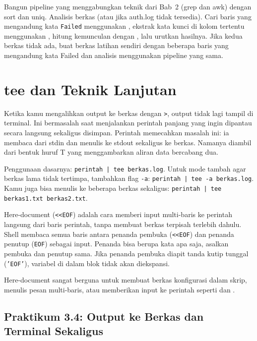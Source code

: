 \begin{challengebox}
Bangun pipeline yang menggabungkan teknik dari Bab~2 (grep dan awk) dengan sort dan uniq. Analisis berkas  (atau  jika auth.log tidak tersedia). Cari baris yang mengandung kata \texttt{Failed} menggunakan , ekstrak kata kunci di kolom tertentu menggunakan , hitung kemunculan dengan , lalu urutkan hasilnya. Jika kedua berkas tidak ada, buat berkas latihan sendiri dengan beberapa baris yang mengandung kata Failed dan analisis menggunakan pipeline yang sama.
\end{challengebox}

\section{tee dan Teknik Lanjutan}
\label{sec:tee-advanced}

Ketika kamu mengalihkan output ke berkas dengan \texttt{>}, output tidak lagi tampil di terminal. Ini bermasalah saat menjalankan perintah panjang yang ingin dipantau secara langsung sekaligus disimpan. Perintah  memecahkan masalah ini: ia membaca dari stdin dan menulis ke stdout sekaligus ke berkas. Namanya diambil dari bentuk huruf T yang menggambarkan aliran data bercabang dua.

Penggunaan dasarnya: \texttt{perintah | tee berkas.log}. Untuk mode tambah agar berkas lama tidak tertimpa, tambahkan flag \texttt{-a}: \texttt{perintah | tee -a berkas.log}. Kamu juga bisa menulis ke beberapa berkas sekaligus: \texttt{perintah | tee berkas1.txt berkas2.txt}.

Here-document (\texttt{<<EOF}) adalah cara memberi input multi-baris ke perintah langsung dari baris perintah, tanpa membuat berkas terpisah terlebih dahulu. Shell membaca semua baris antara penanda pembuka (\texttt{<<EOF}) dan penanda penutup (\texttt{EOF}) sebagai input. Penanda bisa berupa kata apa saja, asalkan pembuka dan penutup sama. Jika penanda pembuka diapit tanda kutip tunggal (\texttt{'EOF'}), variabel di dalam blok tidak akan diekspansi.

Here-document sangat berguna untuk membuat berkas konfigurasi dalam skrip, menulis pesan multi-baris, atau memberikan input ke perintah seperti  dan .

\subsection*{Praktikum 3.4: Output ke Berkas dan Terminal Sekaligus}

